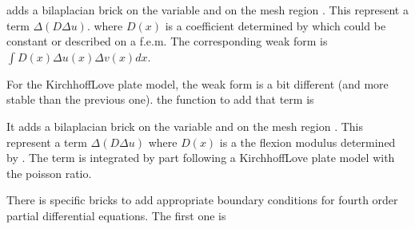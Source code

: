 \documentclass[a4paper,11pt,english]{sphinxmanual}
\begin{document}
\begin{sphinxVerbatim}[commandchars=\\\{\}]
     
                              
\end{sphinxVerbatim}

adds a bilaplacian brick on the variable  and on the mesh region . This represent a term \(\Delta(D \Delta u)\). where \(D(x)\) is a coefficient determined by  which could be constant or described on a f.e.m. The corresponding weak form is \(\int D(x)\Delta u(x) \Delta v(x) dx\).

For the Kirchhoff\sphinxhyphen{}Love plate model, the weak form is a bit different (and more stable than the previous one). the function to add that term is

\begin{sphinxVerbatim}[commandchars=\\\{\}]
      
                                 
\end{sphinxVerbatim}

It adds a bilaplacian brick on the variable  and on the mesh region . This represent a term \(\Delta(D \Delta u)\) where \(D(x)\)
is a the flexion modulus determined by . The term is
integrated by part following a Kirchhoff\sphinxhyphen{}Love plate model
with  the poisson ratio.

There is specific bricks to add appropriate boundary conditions for fourth order partial differential equations. The first one is

\begin{sphinxVerbatim}[commandchars=\\\{\}]
     
                                                
\end{sphinxVerbatim}
\end{document}
